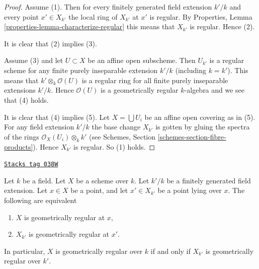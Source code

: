\begin{proof}
Assume (1). Then for every finitely generated field extension
$k'/k$ and
every point $x' \in X_{k'}$ the local ring of $X_{k'}$ at $x'$
is regular. By Properties, Lemma \ref{properties-lemma-characterize-regular}
this means that $X_{k'}$ is regular. Hence (2).

\medskip\noindent
It is clear that (2) implies (3).

\medskip\noindent
Assume (3) and let $U \subset X$ be an affine open subscheme.
Then $U_{k'}$ is a regular scheme for any finite purely inseparable
extension $k'/k$ (including $k = k'$). This means that
$k' \otimes_k \mathcal{O}(U)$ is a regular ring for all
finite purely inseparable extensions $k'/k$. Hence
$\mathcal{O}(U)$ is a geometrically regular $k$-algebra
and we see that (4) holds.

\medskip\noindent
It is clear that (4) implies (5). Let $X = \bigcup U_i$ be an affine
open covering as in (5). For any field extension $k'/k$ the base
change $X_{k'}$ is gotten by gluing the spectra of the
rings $\mathcal{O}_X(U_i) \otimes_k k'$ (see
Schemes, Section \ref{schemes-section-fibre-products}).
Hence $X_{k'}$ is regular. So (1) holds.
\end{proof}

\begin{lemma}
\label{varieties-lemma-geometrically-regular-upstairs}
\href{https://stacks.math.columbia.edu/tag/038W}{\texttt{Stacks tag 038W}}

Let $k$ be a field.
Let $X$ be a scheme over $k$.
Let $k'/k$ be a finitely generated field extension.
Let $x \in X$ be a point, and let $x' \in X_{k'}$ be a point lying over $x$.
The following are equivalent
\begin{enumerate}
\item $X$ is geometrically regular at $x$,
\item $X_{k'}$ is geometrically regular at $x'$.
\end{enumerate}
In particular, $X$ is geometrically regular over $k$ if and only if
$X_{k'}$ is geometrically regular over $k'$.
\end{lemma}

